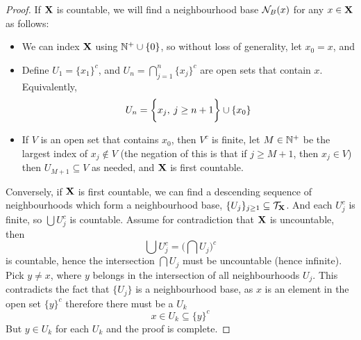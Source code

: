 \documentclass[../../main.tex]{subfiles}
\begin{document}
\begin{proof}
    If ${\mathbf{X}}$ is countable, we will find a neighbourhood base $\mathcal{N}_B({x})$ for any $x \in {\mathbf{X}}$ as follows: 
    \begin{itemize}
        \item We can index ${\mathbf{X}}$ using $\mathbb{N}^+\cup\{0\}$, so without loss of generality, let $x_0 = x$, and 
        \item Define $U_1 = \{x_1\}^c$, and $U_n = \bigcap_{j=1}^n \{x_j\}^c$ are open sets that contain $x$. Equivalently,
        \[
            U_n = \biggl\{{x_j,\: j\geq n+1}\biggr\}\cup\{x_0\}
        \]
        \item If $V$ is an open set that contains $x_0$, then $V^c$ is finite, let $M\in\mathbb{N}^+$ be the largest index of $x_j\notin V$ (the negation of this is that if $j\geq M+1$, then $x_j\in V$) then $U_{M+1}\subseteq V$ as needed, and ${\mathbf{X}}$ is first countable.
    \end{itemize}
    Conversely, if ${\mathbf{X}}$ is first countable, we can find a descending sequence of neighbourhoods which form a neighbourhood base, $\{U_j\}_{j\geq 1}\subseteq \mathcal{T}_{\mathbf{X}}$. And each $U_j^c$ is finite, so $\bigcup U_j^c$ is countable. Assume for contradiction that ${\mathbf{X}}$ is uncountable, then 
    \[
        \bigcup U_j^c = \biggl(\bigcap U_j\biggr)^c
    \]
    is countable, hence the intersection $\bigcap U_j$ must be uncountable (hence infinite). Pick $y\neq x$, where $y$ belongs in the intersection of all neighbourhoods $U_j$. This contradicts the fact that $\{U_j\}$ is a neighbourhood base, as $x$ is an element in the open set $\{y\}^c$ therefore there must be a $U_k$ 
    \[
        x\in U_k\subseteq \{y\}^c
    \]
    But $y\in U_k$ for each $U_k$ and the proof is complete.
\end{proof}

\newpage
\end{document}
